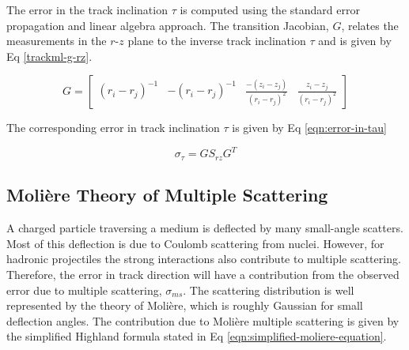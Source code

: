 The error in the track inclination $\tau$ is computed using the standard error propagation and linear algebra approach. The transition Jacobian, $G$, relates the measurements in the $r$-$z$ plane to the inverse track inclination $\tau$ and is given by Eq \eqref{trackml-g-rz}.




\begin{equation}
    G = \begin{bmatrix} 
            (r_i - r_j)^{-1} &
            -(r_i - r_j)^{-1} & 
            \frac{-(z_i - z_j)}{(r_i - r_j)^2} & 
            \frac{z_i - z_j}{(r_i - r_j)^2}
            \end{bmatrix} 
    \label{trackml-g-rz}
\end{equation}

The corresponding error in track inclination $\tau$ is given by Eq \eqref{eqn:error-in-tau}

\begin{equation}
    \sigma_{\tau} = G S_{rz} G^{T}
    \label{eqn:error-in-tau}
\end{equation}






\subsection{Moli\`ere Theory of Multiple Scattering}

A charged particle traversing a medium is deflected by many small-angle scatters. Most of this deflection is due to Coulomb scattering from nuclei. However, for hadronic projectiles the strong interactions also contribute to multiple scattering. Therefore, the error in track direction will have a contribution from the observed error due to multiple scattering, $\sigma_{ms}$. The scattering distribution is well represented by the theory of Moli\`ere, which is roughly Gaussian for small deflection angles. The contribution due to Moli\`ere multiple scattering is given by the simplified Highland formula \cite{moliere-theory-formula, Lynch:1990sq} stated in Eq \eqref{eqn:simplified-moliere-equation}.


